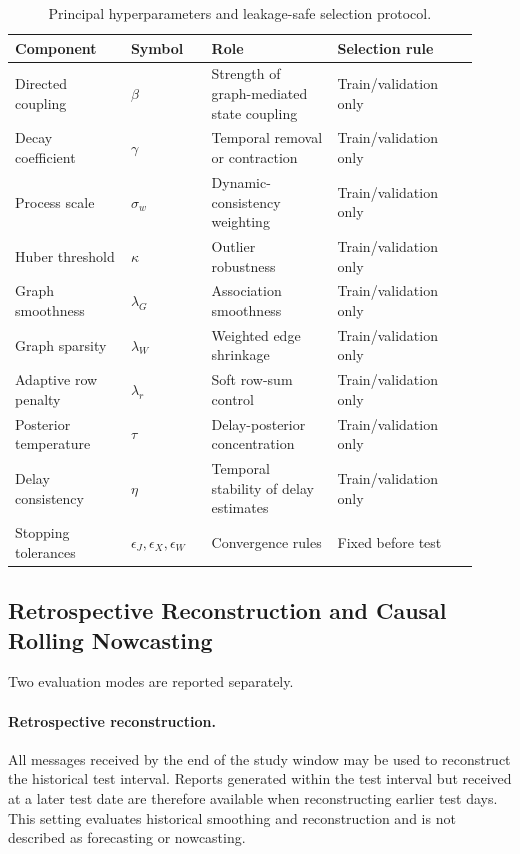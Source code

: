 \begin{table}[!htbp]
\centering
\caption{Principal hyperparameters and leakage-safe selection protocol.}
\label{tab:hyperparameter_protocol_new}
\begin{tabular}{p{0.23\linewidth}p{0.16\linewidth}p{0.25\linewidth}p{0.28\linewidth}}
\hline
\textbf{Component} & \textbf{Symbol} & \textbf{Role} & \textbf{Selection rule} \\
\hline
Directed coupling & $\beta$ & Strength of graph-mediated state coupling & Train/validation only \\
Decay coefficient & $\gamma$ & Temporal removal or contraction & Train/validation only \\
Process scale & $\sigma_w$ & Dynamic-consistency weighting & Train/validation only \\
Huber threshold & $\kappa$ & Outlier robustness & Train/validation only \\
Graph smoothness & $\lambda_G$ & Association smoothness & Train/validation only \\
Graph sparsity & $\lambda_W$ & Weighted edge shrinkage & Train/validation only \\
Adaptive row penalty & $\lambda_r$ & Soft row-sum control & Train/validation only \\
Posterior temperature & $\tau$ & Delay-posterior concentration & Train/validation only \\
Delay consistency & $\eta$ & Temporal stability of delay estimates & Train/validation only \\
Stopping tolerances & $\epsilon_J,\epsilon_X,\epsilon_W$ & Convergence rules & Fixed before test \\
\hline
\end{tabular}
\end{table}

\subsection{Retrospective Reconstruction and Causal Rolling Nowcasting}
\label{subsec:evaluation_modes_new}
Two evaluation modes are reported separately.

\paragraph{Retrospective reconstruction.}
All messages received by the end of the study window may be used to reconstruct the historical test interval. Reports generated within the test interval but received at a later test date are therefore available when reconstructing earlier test days. This setting evaluates historical smoothing and reconstruction and is not described as forecasting or nowcasting.

